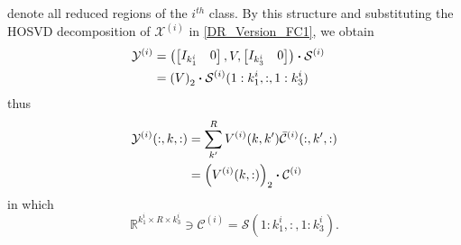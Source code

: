 \documentclass[journal]{IEEEtran}
\begin{document}
	denote all reduced regions of the $i^{th}$ class. By this structure  and substituting the HOSVD decomposition of $\mathcal{X}^{(i)}$ in \eqref{DR_Version_FC1},  we obtain
	\begin{align}
	{\mathcal{Y}}^{(i)}&=  \notag
	\left(
	\begin{bmatrix}
	I_{k_1^i} &  0
	\end{bmatrix},
	V,
	\begin{bmatrix}
	I_{k_3^i} &  0
	\end{bmatrix}
	\right)\boldsymbol{\cdot} \mathcal{S}^{(i)} \notag
	\\&=\left( 
	V
	\right)_{2} \boldsymbol{\cdot} \mathcal{S}^{(i)}(1:k_1^i,:, 1:k_3^i) \notag &
	\end{align}
	thus
	\begin{align}
	\label{ok}
	{\mathcal{Y}}^{(i)}(:,k,:) &= \sum_{k'}^{R} V^{(i)}(k,k')\bar{\mathcal{C}}^{(i)}(:,k',:) \notag
	\\&= \left( V^{(i)}(k,:)\right)_2 \boldsymbol{\cdot} {\mathcal{C}}^{(i)}
	\end{align}
	in which 
	\[
	\mathbb{R}^{k_1^i\times R \times k_3^i}\ni {\mathcal{C}}^{(i)} = \mathcal{S}(1:k_1^i,:,1:k_3^i).
	\]
	
\end{document}
